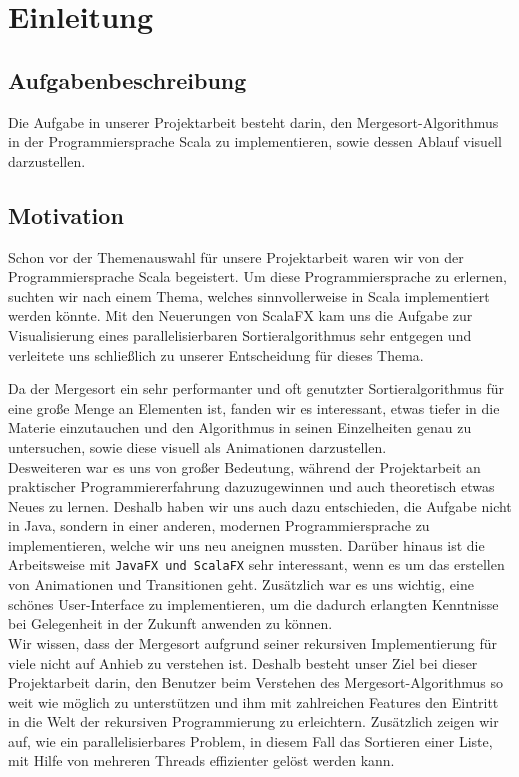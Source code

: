 \chapter{Einleitung}\label{chap:intro}
\section{Aufgabenbeschreibung}
Die Aufgabe in unserer Projektarbeit besteht darin, den Mergesort-Algorithmus in der Programmiersprache Scala zu implementieren, sowie dessen Ablauf visuell darzustellen.
\section{Motivation}
Schon vor der Themenauswahl für unsere Projektarbeit waren wir von der Programmiersprache Scala begeistert. Um diese Programmiersprache zu erlernen, suchten wir nach einem Thema, welches sinnvollerweise in Scala implementiert werden könnte. Mit den Neuerungen von ScalaFX kam uns die Aufgabe zur Visualisierung eines parallelisierbaren Sortieralgorithmus sehr entgegen und verleitete uns schließlich zu unserer Entscheidung für dieses Thema.

Da der Mergesort ein sehr performanter und oft genutzter Sortieralgorithmus für eine große Menge an Elementen ist, fanden wir es interessant, etwas tiefer in die Materie einzutauchen und den Algorithmus in seinen Einzelheiten genau zu untersuchen, sowie diese visuell als Animationen darzustellen.\\
Desweiteren war es uns von großer Bedeutung, während der Projektarbeit an praktischer Programmiererfahrung dazuzugewinnen und auch theoretisch etwas Neues zu lernen. Deshalb haben wir uns auch dazu entschieden, die Aufgabe nicht in Java, sondern in einer anderen, modernen Programmiersprache zu implementieren, welche wir uns neu aneignen mussten. Darüber hinaus ist die Arbeitsweise mit \texttt{JavaFX und ScalaFX} sehr interessant, wenn es um das erstellen von Animationen und Transitionen geht. Zusätzlich war es uns wichtig, eine schönes User-Interface zu implementieren, um die dadurch erlangten Kenntnisse bei Gelegenheit in der Zukunft anwenden zu können.\\
Wir wissen, dass der Mergesort aufgrund seiner rekursiven Implementierung für viele nicht auf Anhieb zu verstehen ist. Deshalb besteht unser Ziel bei dieser Projektarbeit darin, den Benutzer beim Verstehen des Mergesort-Algorithmus so weit wie möglich zu unterstützen und ihm mit zahlreichen Features den Eintritt in die Welt der rekursiven Programmierung zu erleichtern. Zusätzlich zeigen wir auf, wie ein parallelisierbares Problem, in diesem Fall das Sortieren einer Liste, mit Hilfe von mehreren Threads effizienter gelöst werden kann.

